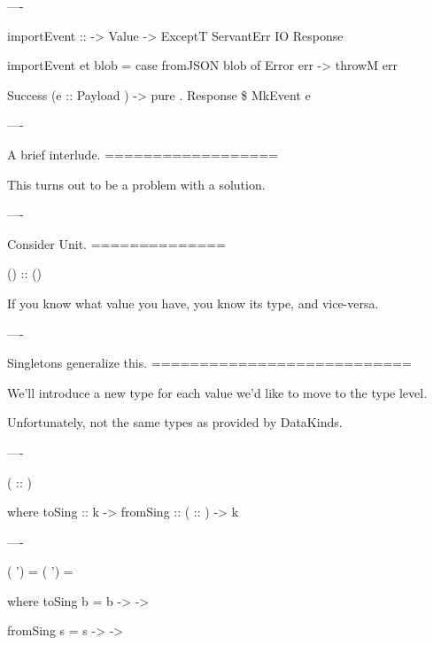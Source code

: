 ----

\begin{raw}
  importEvent :: 
              -> Value
              -> ExceptT ServantErr IO Response

  importEvent et blob =
    case fromJSON blob of
      Error err ->
        throwM err

      Success (e :: Payload ) ->
        pure . Response \$ MkEvent e
\end{raw}

----

A brief interlude.
==================

This turns out to be a problem with a solution.

----

Consider Unit.
==============

\begin{hs}
  () :: ()
\end{hs}

If you know what value you have, you know its type, and vice-versa.

----

Singletons generalize this.
===========================

We'll introduce a new type for each value we'd like to move to the type level.

Unfortunately, not the same types as provided by DataKinds.

----

\begin{custom}

    ( :: )

     where
    toSing   :: k ->  
    fromSing ::  ( :: ) -> k
\end{custom}

----

\begin{custom}
   ( ')  = 
   ( ') = 


     where
    toSing b =  b 
        -> 
       -> 

    fromSing s =  s 
       -> 
       -> 
\end{custom}

